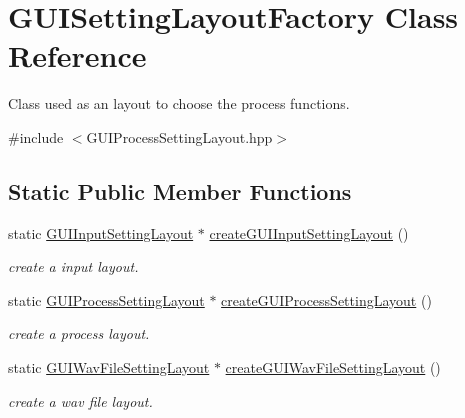 \hypertarget{class_g_u_i_setting_layout_factory}{}\section{G\+U\+I\+Setting\+Layout\+Factory Class Reference}
\label{class_g_u_i_setting_layout_factory}


Class used as an layout to choose the process functions.  




{\ttfamily \#include $<$G\+U\+I\+Process\+Setting\+Layout.\+hpp$>$}

\subsection*{Static Public Member Functions}
\begin{DoxyCompactItemize}
\item 
\mbox{\label{class_g_u_i_setting_layout_factory_a3cfa47c664fcc2454817f3ef0fabf650}} 
static \mbox{\hyperlink{class_g_u_i_input_setting_layout}{G\+U\+I\+Input\+Setting\+Layout}} $\ast$ \mbox{\hyperlink{class_g_u_i_setting_layout_factory_a3cfa47c664fcc2454817f3ef0fabf650}{create\+G\+U\+I\+Input\+Setting\+Layout}} ()
\begin{DoxyCompactList}\small\item\em create a input layout. \end{DoxyCompactList}\item 
\mbox{\label{class_g_u_i_setting_layout_factory_a1e4394f422b441ece0d8d174c68b72b5}} 
static \mbox{\hyperlink{class_g_u_i_process_setting_layout}{G\+U\+I\+Process\+Setting\+Layout}} $\ast$ \mbox{\hyperlink{class_g_u_i_setting_layout_factory_a1e4394f422b441ece0d8d174c68b72b5}{create\+G\+U\+I\+Process\+Setting\+Layout}} ()
\begin{DoxyCompactList}\small\item\em create a process layout. \end{DoxyCompactList}\item 
\mbox{\label{class_g_u_i_setting_layout_factory_a76d1153ab72fe1e753cedc9b5c58652c}} 
static \mbox{\hyperlink{class_g_u_i_wav_file_setting_layout}{G\+U\+I\+Wav\+File\+Setting\+Layout}} $\ast$ \mbox{\hyperlink{class_g_u_i_setting_layout_factory_a76d1153ab72fe1e753cedc9b5c58652c}{create\+G\+U\+I\+Wav\+File\+Setting\+Layout}} ()
\begin{DoxyCompactList}\small\item\em create a wav file layout. \end{DoxyCompactList}\end{DoxyCompactItemize}


